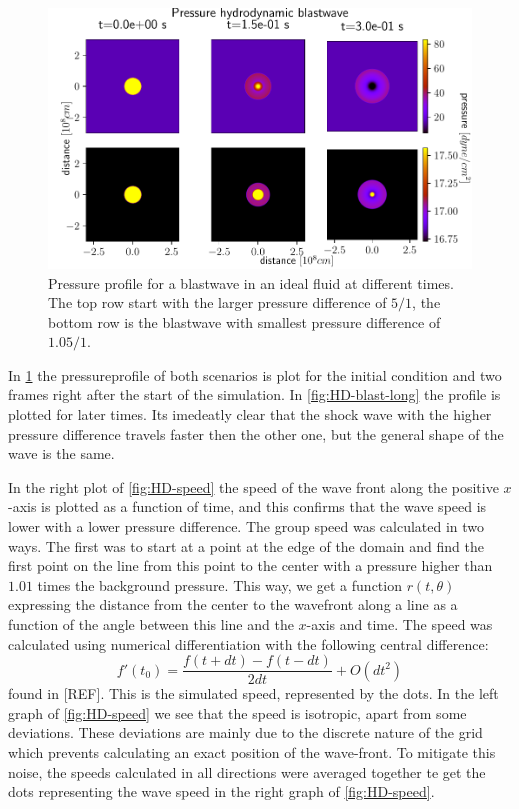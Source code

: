 \begin{figure}[H]
	\centering
	\includegraphics[width=\linewidth]{images/HD-blast-prs-1.pdf}
	\caption{Pressure profile for a blastwave in an ideal fluid at different times. The top row start with the larger pressure difference of $5/1$, the bottom row is the blastwave with smallest pressure difference of $1.05/1$.}
	\label{fig:HD-blast-short}
\end{figure}

In \cref{fig:HD-blast-short} the pressureprofile of both scenarios is plot for the initial condition and two frames right after the start of the simulation.
In \cref{fig:HD-blast-long} the profile is plotted for later times.
Its imedeatly clear that the shock wave with the higher pressure difference travels faster then the other one, but the general shape of the wave is the same.


In the right plot of \cref{fig:HD-speed} the speed of the wave front along the positive $x$-axis is plotted as a function of time, and this confirms that the wave speed is lower with a lower pressure difference.
The group speed was calculated in two ways. 
The first was to start at a point at the edge of the domain and find the first point on the line from this point to the center with a pressure higher than $1.01$ times the background pressure.
This way, we get a function $r(t,\theta)$ expressing the distance from the center to the wavefront along a line as a function of the angle between this line and the $x$-axis and time.
The speed was calculated using numerical differentiation with the following central difference:
\begin{equation*}
	f'(t_0) = \frac{f(t+dt)-f(t-dt)}{2dt} + O(dt^2)
\end{equation*}
found in [REF]. This is the simulated speed, represented by the dots.
In the left graph of \cref{fig:HD-speed} we see that the speed is isotropic, apart from some deviations.
These deviations are mainly due to the discrete nature of the grid which prevents calculating an exact position of the wave-front.
To mitigate this noise, the speeds calculated in all directions were averaged together te get the dots representing the wave speed in the right graph of \cref{fig:HD-speed}.

